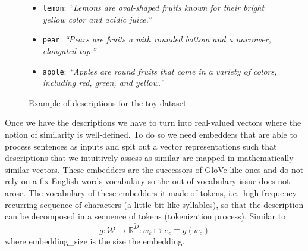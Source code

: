 \begin{figure}[htbp]
  \begin{minipage}{\textwidth}
    \begin{itemize}
      \item \texttt{lemon}: \emph{\small``Lemons are \alert{oval-shaped} fruits
        known for their \alert{bright yellow} color and acidic juice.''}
      \item \texttt{pear}: \emph{\small``Pears are fruits a with \alert{rounded
        bottom} and a narrower, \alert{elongated top}.''}
      \item \texttt{apple}: \emph{\small``Apples are \alert{round} fruits that
        come in a variety of colors, including \alert{red}, \alert{green}, and
        \alert{yellow}.''}
    \end{itemize}
    \caption{Example of descriptions for the toy dataset}
    \label{fig:descriptions}
  \end{minipage}
\end{figure}

Once we have the descriptions we have to turn into real-valued vectors where the
notion of similarity is well-defined. To do so we need embedders that are able
to process sentences as inputs and spit out a vector representations such that
descriptions that we intuitively assess as similar are mapped in
mathematically-similar vectors. These embedders are the successors of GloVe-like
ones and do not rely on a fix English words vocabulary so the out-of-vocabulary
issue does not arose. The vocabulary of these embedders it made of tokens, i.e.\
high frequency recurring sequence of characters (a little bit like syllables),
so that the description can be decomposed in a sequence of tokens (tokenization
process). Similar to~\Cref{eq:word-encoding}
\begin{equation}
  g : \mathcal{W} \to \mathbb{R}^{\tilde{D}} :
  w_c \mapsto e_c \equiv g(w_c)
  \label{eq:desc-embedding}
\end{equation}
where \gls{embedding_size} is the size the embedding.\\

